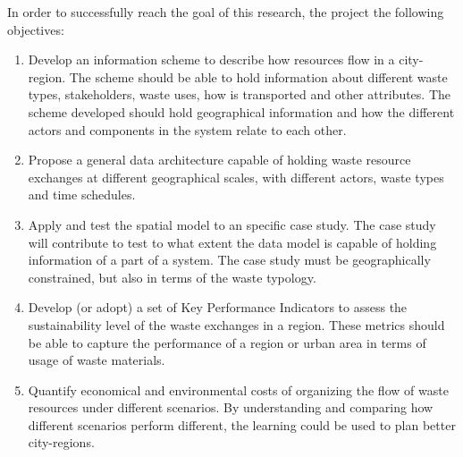 In order to  successfully reach the goal of this research, the project the following objectives:
\begin{enumerate}

    \item 
    Develop an information scheme to describe how resources flow in a city-region. The scheme should be able to hold information about different waste types, stakeholders, waste uses, how is transported and other attributes. The scheme developed should hold geographical information and how the different actors and components in the system relate to each other.
    
    \item 
    Propose a general data architecture capable of holding waste resource exchanges at different geographical scales, with different actors, waste types and time schedules. 
    
    \item 
    Apply and test the spatial model  %
    to an specific case study. The case study will contribute to test to what extent the data model is capable of holding information of a part of a system. The case study must be geographically constrained, but also in terms of the waste typology. 
    
    \item 
    Develop (or adopt) a set of Key Performance Indicators to assess the sustainability level of the waste exchanges in a region. These metrics should be able to capture the performance of a region or urban area in terms of usage of waste materials. 
    
    \item Quantify economical and environmental costs of organizing the flow of waste resources under different scenarios. By understanding and comparing how different scenarios perform different, the learning could be used to plan better city-regions.

\end{enumerate}


